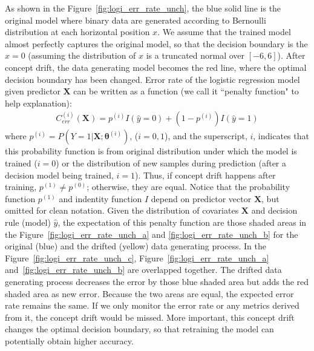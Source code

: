 \documentclass[twoside,11pt]{article}
\begin{document}
As shown in the Figure~\ref{fig:logi_err_rate_unch}, the blue solid line is the original model where binary data are generated according to Bernoulli distribution at each horizontal position $x$. We assume that the trained model almost perfectly captures the original model, so that the decision boundary is the $x=0$ (assuming the distribution of $x$ is a truncated normal over $[-6, 6]$). After concept drift, the data generating model becomes the red line, where the optimal decision boundary has been changed. Error rate of the logistic regression model given predictor $\bm {X}$ can be written as a function (we call it ``penalty function" to help explanation):
\begin{align}
C _{err}^{(i)}(\bm {X}) = p ^{(i)}I(\hat{y}=0)+(1-p ^{(i)})I(\hat{y}=1)
\label{eqn:penal_err}
\end{align}
where $p ^{(i)} = P(Y=1|\bm {X}; \bm { \theta} ^{(i)})$, ($i=0,1$), and the superscript, $i$, indicates that this probability function is from original distribution under which the model is trained ($i=0$) or the distribution of new samples during prediction (after a decision model being trained, $i=1$). Thus, if concept drift happens after training, $p ^{(1)} \neq p ^{(0)}$; otherwise, they are equal. Notice that the probability function $p ^{(1)}$ and indentity function $I$ depend on predictor vector $\bm {X}$, but omitted for clean notation. Given the distribution of covariates $\bm {X}$ and decision rule (model) $\hat{y}$, the expectation of this penalty function are those shaded areas in the Figure~\ref{fig:logi_err_rate_unch_a} and \ref{fig:logi_err_rate_unch_b} for the original (blue) and the drifted (yellow) data generating process. In the Figure~\ref{fig:logi_err_rate_unch_c}, Figure~\ref{fig:logi_err_rate_unch_a} and~\ref{fig:logi_err_rate_unch_b} are overlapped together. The drifted data generating process decreases the error by those blue shaded area but adds the red shaded area as new error. Because the two areas are equal, the expected error rate remains the same. If we only monitor the error rate or any metrics derived from it, the concept drift would be missed. More important, this concept drift changes the optimal decision boundary, so that retraining the model can potentially obtain higher accuracy. 
\end{document}
